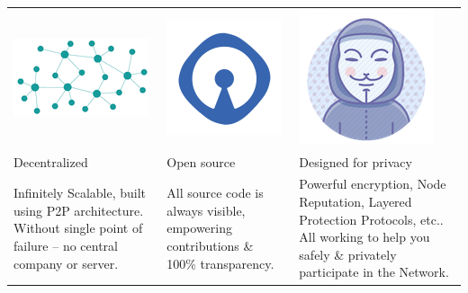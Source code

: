 \centering
\begin{adjustbox}{width=1\textwidth}
\begin{tabularx} {\textwidth}{|Y|Y|Y|}
 \hline
 \includegraphics[scale=0.3]{static/decentnew} & \includegraphics[scale=0.3]{static/opensource} & \includegraphics[scale=0.3]{static/privacy}\\ 
Decentralized & Open source & Designed for privacy\\
Infinitely Scalable, built using P2P architecture. Without single point of failure – no central company or server. & All source code is always visible, empowering contributions \& 100\% transparency. & Powerful encryption, Node Reputation, Layered Protection Protocols, etc.. All working to help you safely \& privately participate in the Network. \\
 \hline
\end{tabularx}
\end{adjustbox}
